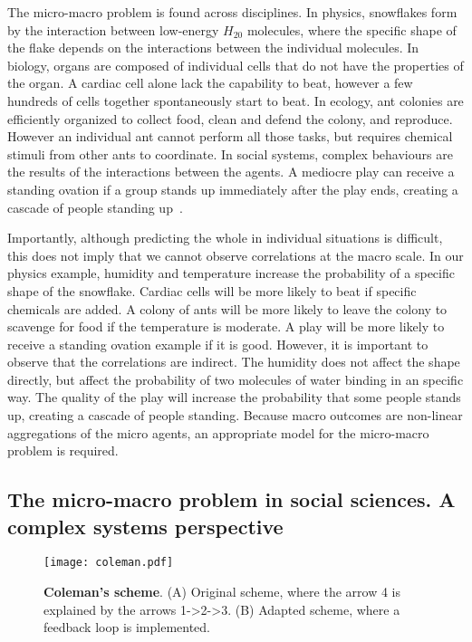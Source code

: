 The micro-macro problem is found across disciplines. 
In physics, snowflakes form by the interaction between low-energy $H_20$ molecules, 
where the specific shape of the flake depends on the interactions between the individual molecules.
In biology, organs are composed of individual cells that do not have the properties of the organ. 
A cardiac cell alone lack the capability to beat, however a few hundreds of cells together spontaneously start to beat.
In ecology, ant colonies are efficiently organized to collect food, clean and defend the colony, and reproduce. 
However an individual ant cannot perform all those tasks, 
but requires chemical stimuli from other ants to coordinate.
In social systems, complex behaviours are the results of the interactions between the agents. 
A mediocre play can receive a standing ovation if a group stands up immediately after the play ends, 
creating a cascade of people standing up~\citep{miller2004}. 

Importantly, although predicting the whole in individual situations is difficult, 
this does not imply that we cannot observe correlations at the macro scale. 
In our physics example, humidity and temperature increase the probability of a specific shape of the snowflake. 
Cardiac cells will be more likely to beat if specific chemicals are added.
A colony of ants will be more likely to leave the colony to scavenge for food if the temperature is moderate. 
A play will be more likely to receive a standing ovation example if it is good.
However, it is important to observe that the correlations are indirect.
The humidity does not affect the shape directly, but affect the probability of two molecules of water binding in an specific way. 
The quality of the play will increase the probability that some people stands up, 
creating a cascade of people standing. 
Because macro outcomes are non-linear aggregations of the micro agents, 
an appropriate model for the micro-macro problem is required.


\subsection{The micro-macro problem in social sciences. A complex systems perspective}
\label{sec:complexSocialSystems}
\begin{figure}[h!]
\begin{center}
\texttt{[image: coleman.pdf]}
\end{center}
\caption{\textbf{Coleman's scheme}. (A) Original scheme, where the arrow 4 is explained by the arrows 1->2->3. (B) Adapted scheme, where a feedback loop is implemented.}
\label{fig:coleman_scheme}
\end{figure}

